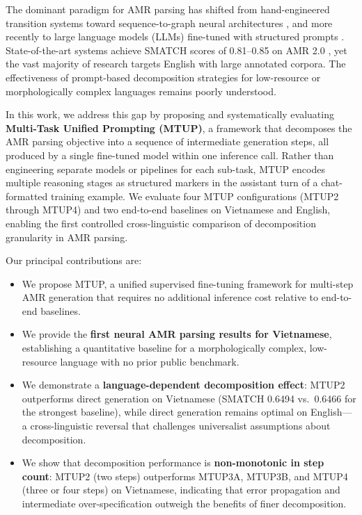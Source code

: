 \documentclass[11pt,a4paper]{article}
\begin{document}
The dominant paradigm for AMR parsing has shifted from hand-engineered
transition systems \citep{wang2015broad,damonte2017incremental} toward
sequence-to-graph neural architectures \citep{zhang2019amr,bevilacqua2021spring},
and more recently to large language models (LLMs) fine-tuned with structured
prompts \citep{xie2023universal,li2023gpt}. State-of-the-art systems achieve
SMATCH scores of 0.81--0.85 on AMR 2.0 \citep{li2023gpt}, yet the vast
majority of research targets English with large annotated corpora. The
effectiveness of prompt-based decomposition strategies for low-resource or
morphologically complex languages remains poorly understood.

In this work, we address this gap by proposing and systematically evaluating
\textbf{Multi-Task Unified Prompting (MTUP)}, a framework that decomposes the
AMR parsing objective into a sequence of intermediate generation steps, all
produced by a single fine-tuned model within one inference call. Rather than
engineering separate models or pipelines for each sub-task, MTUP encodes
multiple reasoning stages as structured markers in the assistant turn of a
chat-formatted training example. We evaluate four MTUP configurations (MTUP2
through MTUP4) and two end-to-end baselines on Vietnamese and English,
enabling the first controlled cross-linguistic comparison of decomposition
granularity in AMR parsing.

Our principal contributions are:

\begin{itemize}
    \item We propose MTUP, a unified supervised fine-tuning framework for
          multi-step AMR generation that requires no additional inference cost
          relative to end-to-end baselines.

    \item We provide the \textbf{first neural AMR parsing results for Vietnamese},
          establishing a quantitative baseline for a morphologically complex,
          low-resource language with no prior public benchmark.

    \item We demonstrate a \textbf{language-dependent decomposition effect}: MTUP2
          outperforms direct generation on Vietnamese (SMATCH 0.6494 vs.\
          0.6466 for the strongest baseline), while direct generation remains
          optimal on English---a cross-linguistic reversal that challenges
          universalist assumptions about decomposition.

    \item We show that decomposition performance is \textbf{non-monotonic in step
          count}: MTUP2 (two steps) outperforms MTUP3A, MTUP3B, and MTUP4
          (three or four steps) on Vietnamese, indicating that error propagation
          and intermediate over-specification outweigh the benefits of finer
          decomposition.
\end{itemize}
\end{document}
